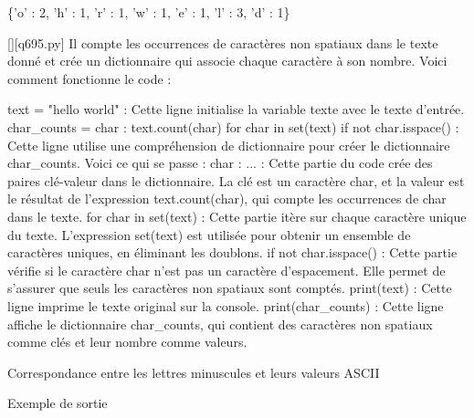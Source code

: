 \{'o' : 2, 'h' : 1, 'r' : 1, 'w' : 1, 'e' : 1, 'l' : 3, 'd' : 1\}
        \par
        \begin{solution}
            \renewcommand{\nomfichier}{q695.py}
            \pythonfile{\chemincode \nomfichier}[][\nomfichier]
            Il compte les occurrences de caractères non spatiaux dans le texte donné et crée un dictionnaire qui associe chaque caractère à son nombre. Voici comment fonctionne le code :

    text = "hello world" : Cette ligne initialise la variable texte avec le texte d'entrée.
    char_counts = {char : text.count(char) for char in set(text) if not char.isspace()} : Cette ligne utilise une compréhension de dictionnaire pour créer le dictionnaire char_counts. Voici ce qui se passe :
        {char : ...} : Cette partie du code crée des paires clé-valeur dans le dictionnaire. La clé est un caractère char, et la valeur est le résultat de l'expression text.count(char), qui compte les occurrences de char dans le texte.
        for char in set(text) : Cette partie itère sur chaque caractère unique du texte. L'expression set(text) est utilisée pour obtenir un ensemble de caractères uniques, en éliminant les doublons.
        if not char.isspace() : Cette partie vérifie si le caractère char n'est pas un caractère d'espacement. Elle permet de s'assurer que seuls les caractères non spatiaux sont comptés.
    print(text) : Cette ligne imprime le texte original sur la console.
    print(char_counts) : Cette ligne affiche le dictionnaire char_counts, qui contient des caractères non spatiaux comme clés et leur nombre comme valeurs.
        \end{solution}
        

        \question
        Correspondance entre les lettres minuscules et leurs valeurs ASCII

Exemple de sortie

